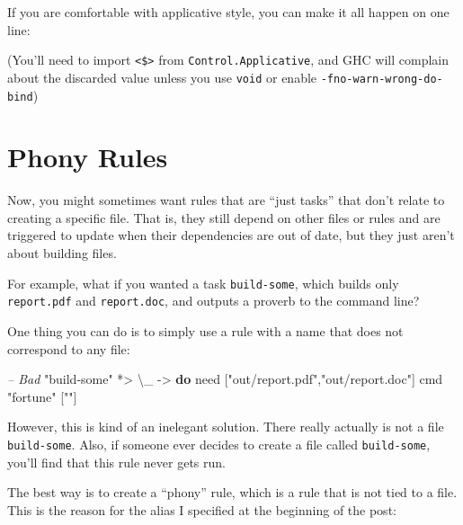 \documentclass[]{article}
\newenvironment{Shaded}{}{}
\newcommand{\CommentTok}[1]{\textcolor[rgb]{0.38,0.63,0.69}{\textit{#1}}}
\newcommand{\FunctionTok}[1]{\textcolor[rgb]{0.02,0.16,0.49}{#1}}
\newcommand{\KeywordTok}[1]{\textcolor[rgb]{0.00,0.44,0.13}{\textbf{#1}}}
\newcommand{\NormalTok}[1]{#1}
\newcommand{\OtherTok}[1]{\textcolor[rgb]{0.00,0.44,0.13}{#1}}
\newcommand{\StringTok}[1]{\textcolor[rgb]{0.25,0.44,0.63}{#1}}
\begin{document}
If you are comfortable with applicative style, you can make it all happen on one
line:

\begin{Shaded}
\end{Shaded}

(You'll need to import \texttt{\textless{}\$\textgreater{}} from
\texttt{Control.Applicative}, and GHC will complain about the discarded value
unless you use \texttt{void} or enable \texttt{-fno-warn-wrong-do-bind})

\hypertarget{phony-rules}{%
\section{Phony Rules}\label{phony-rules}}

Now, you might sometimes want rules that are ``just tasks'' that don't relate to
creating a specific file. That is, they still depend on other files or rules and
are triggered to update when their dependencies are out of date, but they just
aren't about building files.

For example, what if you wanted a task \texttt{build-some}, which builds only
\texttt{report.pdf} and \texttt{report.doc}, and outputs a proverb to the
command line?

One thing you can do is to simply use a rule with a name that does not
correspond to any file:

\begin{Shaded}
\begin{Highlighting}[]
\CommentTok{-- Bad}
\StringTok{"build-some"} \FunctionTok{*>}\NormalTok{ \textbackslash{}_ }\OtherTok{->} \KeywordTok{do}
\NormalTok{    need [}\StringTok{"out/report.pdf"}\NormalTok{,}\StringTok{"out/report.doc"}\NormalTok{]}
\NormalTok{    cmd }\StringTok{"fortune"}\NormalTok{ [}\StringTok{""}\NormalTok{]}
\end{Highlighting}
\end{Shaded}

However, this is kind of an inelegant solution. There really actually is not a
file \texttt{build-some}. Also, if someone ever decides to create a file called
\texttt{build-some}, you'll find that this rule never gets run.

The best way is to create a ``phony'' rule, which is a rule that is not tied to
a file. This is the reason for the alias I specified at the beginning of the
post:
\end{document}
